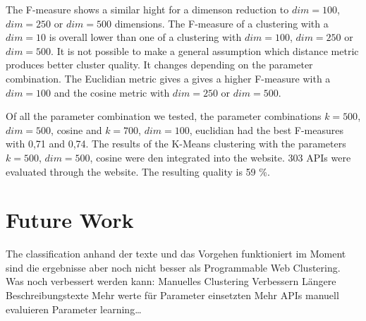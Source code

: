 \documentclass[a4paper]{IEEEtran}
\begin{document}
The F-measure shows a similar hight for a dimenson reduction to $dim⁡= 100$, $dim⁡= 250$ or $dim⁡= 500$ dimensions. The F-measure of a clustering with a $dim=10$ is overall lower than one of a clustering with $dim⁡= 100$, $dim⁡= 250$ or $dim⁡= 500$. 
It is not possible to make a general assumption which distance metric produces better cluster quality. It changes depending on the parameter combination. The Euclidian metric gives a gives a higher F-measure with a $dim⁡= 100$ and the cosine metric with $dim⁡= 250$ or $dim⁡= 500$.

Of all the parameter combination we tested, the parameter combinations $k⁡= 500$, $dim⁡= 500$, cosine and $k⁡= 700$, $dim⁡= 100$, euclidian had the best F-measures with 0,71 and 0,74.
The results of the K-Means clustering with the parameters $k⁡= 500$, $dim⁡= 500$, cosine were den integrated into the website. 303 APIs were evaluated through the website. The resulting quality is 59 \%.



\section{Future Work}
The classification anhand der texte und das Vorgehen funktioniert im Moment sind die ergebnisse aber noch nicht besser als Programmable Web Clustering. Was noch verbessert werden kann: 
Manuelles Clustering Verbessern
Längere Beschreibungstexte
Mehr werte für Parameter einsetzten
Mehr APIs manuell evaluieren
Parameter learning… 


\newpage







\end{document}
